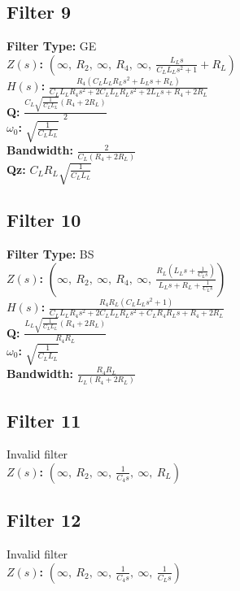\documentclass{article}
\begin{document}
\subsection*{Filter 9}
\textbf{Filter Type:} GE \\ 
\textbf{$Z(s)$:} $\left( \infty, \  R_{2}, \  \infty, \  R_{4}, \  \infty, \  \frac{L_{L} s}{C_{L} L_{L} s^{2} + 1} + R_{L}\right)$ \\ 
\textbf{$H(s)$:} $\frac{R_{4} \left(C_{L} L_{L} R_{L} s^{2} + L_{L} s + R_{L}\right)}{C_{L} L_{L} R_{4} s^{2} + 2 C_{L} L_{L} R_{L} s^{2} + 2 L_{L} s + R_{4} + 2 R_{L}}$ \\ 
\textbf{Q:} $\frac{C_{L} \sqrt{\frac{1}{C_{L} L_{L}}} \left(R_{4} + 2 R_{L}\right)}{2}$ \\ 
\textbf{$\omega_0$:} $\sqrt{\frac{1}{C_{L} L_{L}}}$ \\ 
\textbf{Bandwidth:} $\frac{2}{C_{L} \left(R_{4} + 2 R_{L}\right)}$ \\ 
\textbf{Qz:} $C_{L} R_{L} \sqrt{\frac{1}{C_{L} L_{L}}}$ \\ 
\subsection*{Filter 10}
\textbf{Filter Type:} BS \\ 
\textbf{$Z(s)$:} $\left( \infty, \  R_{2}, \  \infty, \  R_{4}, \  \infty, \  \frac{R_{L} \left(L_{L} s + \frac{1}{C_{L} s}\right)}{L_{L} s + R_{L} + \frac{1}{C_{L} s}}\right)$ \\ 
\textbf{$H(s)$:} $\frac{R_{4} R_{L} \left(C_{L} L_{L} s^{2} + 1\right)}{C_{L} L_{L} R_{4} s^{2} + 2 C_{L} L_{L} R_{L} s^{2} + C_{L} R_{4} R_{L} s + R_{4} + 2 R_{L}}$ \\ 
\textbf{Q:} $\frac{L_{L} \sqrt{\frac{1}{C_{L} L_{L}}} \left(R_{4} + 2 R_{L}\right)}{R_{4} R_{L}}$ \\ 
\textbf{$\omega_0$:} $\sqrt{\frac{1}{C_{L} L_{L}}}$ \\ 
\textbf{Bandwidth:} $\frac{R_{4} R_{L}}{L_{L} \left(R_{4} + 2 R_{L}\right)}$ \\ 
\subsection*{Filter 11}
Invalid filter \\ 
\textbf{$Z(s)$:} $\left( \infty, \  R_{2}, \  \infty, \  \frac{1}{C_{4} s}, \  \infty, \  R_{L}\right)$ \\ 
\subsection*{Filter 12}
Invalid filter \\ 
\textbf{$Z(s)$:} $\left( \infty, \  R_{2}, \  \infty, \  \frac{1}{C_{4} s}, \  \infty, \  \frac{1}{C_{L} s}\right)$ \\ 
\end{document}
